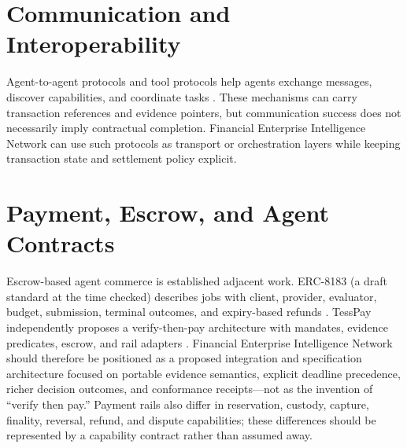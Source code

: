 \documentclass[12pt,a4paper,oneside]{report}
\begin{document}
\section{Communication and Interoperability}
Agent-to-agent protocols and tool protocols help agents exchange messages, discover capabilities, and coordinate tasks \cite{a2a,mcp}. These mechanisms can carry transaction references and evidence pointers, but communication success does not necessarily imply contractual completion. Financial Enterprise Intelligence Network can use such protocols as transport or orchestration layers while keeping transaction state and settlement policy explicit.

\section{Payment, Escrow, and Agent Contracts}
Escrow-based agent commerce is established adjacent work. ERC-8183 (a draft standard at the time checked) describes jobs with client, provider, evaluator, budget, submission, terminal outcomes, and expiry-based refunds \cite{erc8183}. TessPay independently proposes a verify-then-pay architecture with mandates, evidence predicates, escrow, and rail adapters \cite{tesspay}. Financial Enterprise Intelligence Network should therefore be positioned as a proposed integration and specification architecture focused on portable evidence semantics, explicit deadline precedence, richer decision outcomes, and conformance receipts—not as the invention of ``verify then pay.'' Payment rails also differ in reservation, custody, capture, finality, reversal, refund, and dispute capabilities; these differences should be represented by a capability contract rather than assumed away.
\end{document}
